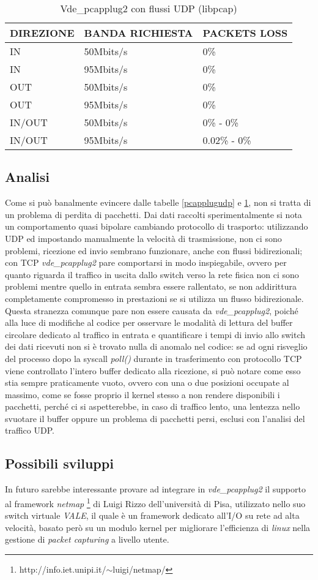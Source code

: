 \begin{table}[h]
\begin{tabular}{|p{}|p{}|p{}|}
\hline
DIREZIONE    & BANDA RICHIESTA   &  PACKETS LOSS   \\
\hline
\hline
IN       & 50Mbits/s  &  0\%   \\
\hline
IN       & 95Mbits/s  &  0\%   \\
\hline
OUT      & 50Mbits/s  &  0\%  \\
\hline
OUT      & 95Mbits/s  &  0\%  \\
\hline
IN/OUT   & 50Mbits/s  &  0\% - 0\%   \\
\hline
IN/OUT   & 95Mbits/s  &  0.02\% - 0\%   \\
\hline
\end{tabular}
\caption{Vde\_pcapplug2 con flussi UDP (libpcap)}
\label{pcapplugudpx}
\end{table}
\subsection{Analisi}
Come si può banalmente evincere dalle tabelle {\ref{pcapplugudp}} e {\ref{pcapplugudpx}}, non si tratta di un problema di perdita di pacchetti. Dai dati raccolti sperimentalmente si nota un comportamento quasi bipolare cambiando protocollo di trasporto: utilizzando UDP ed impostando manualmente la velocità di trasmissione, non ci sono problemi, ricezione ed invio sembrano funzionare, anche con flussi bidirezionali; con TCP {\em vde\_pcapplug2} pare comportarsi in modo inspiegabile, ovvero per quanto riguarda il traffico in uscita dallo switch verso la rete fisica non ci sono problemi mentre quello in entrata sembra essere rallentato, se non addirittura completamente compromesso in prestazioni se si utilizza un flusso bidirezionale. Questa stranezza comunque pare non essere causata da {\em vde\_pcapplug2}, poiché alla luce di modifiche al codice per osservare le modalità di lettura del buffer circolare dedicato al traffico in entrata e quantificare i tempi di invio allo switch dei dati ricevuti non si è trovato nulla di anomalo nel codice: se ad ogni risveglio del processo dopo la syscall {\em poll()} durante in trasferimento con protocollo TCP viene controllato l'intero buffer dedicato alla ricezione, si può notare come esso stia sempre praticamente vuoto, ovvero con una o due posizioni occupate al massimo, come se fosse proprio il kernel stesso a non rendere disponibili i pacchetti, perché ci si aspetterebbe, in caso di traffico lento, una lentezza nello svuotare il buffer oppure un problema di pacchetti persi, esclusi con l'analisi del traffico UDP.
\subsection{Possibili sviluppi}
In futuro sarebbe interessante provare ad integrare in {\em vde\_pcapplug2} il supporto al framework {\em netmap} \footnote{http://info.iet.unipi.it/$\sim$luigi/netmap/} di Luigi Rizzo dell'università di Pisa, utilizzato nello suo switch virtuale {\em VALE}, il quale è un framework dedicato all'I/O su rete ad alta velocità, basato però su un modulo kernel per migliorare l'efficienza di {\em linux} nella gestione di {\em packet capturing} a livello utente.